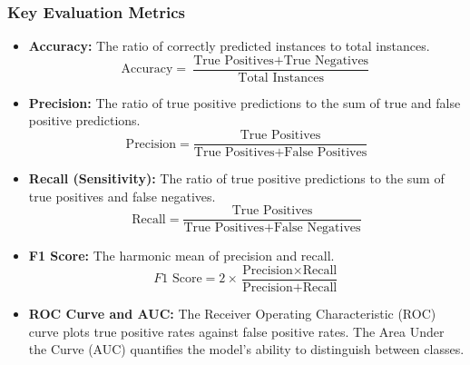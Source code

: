 \documentclass[aspectratio=169]{beamer}
\begin{document}
\begin{frame}[fragile]
    \frametitle{Key Evaluation Metrics}
    \begin{itemize}
        \item \textbf{Accuracy:} The ratio of correctly predicted instances to total instances.
        \begin{equation}
            \text{Accuracy} = \frac{\text{True Positives} + \text{True Negatives}}{\text{Total Instances}}
        \end{equation}
        
        \item \textbf{Precision:} The ratio of true positive predictions to the sum of true and false positive predictions.
        \begin{equation}
            \text{Precision} = \frac{\text{True Positives}}{\text{True Positives} + \text{False Positives}}
        \end{equation}
        
        \item \textbf{Recall (Sensitivity):} The ratio of true positive predictions to the sum of true positives and false negatives.
        \begin{equation}
            \text{Recall} = \frac{\text{True Positives}}{\text{True Positives} + \text{False Negatives}}
        \end{equation}
        
        \item \textbf{F1 Score:} The harmonic mean of precision and recall.
        \begin{equation}
            F1 \text{ Score} = 2 \times \frac{\text{Precision} \times \text{Recall}}{\text{Precision} + \text{Recall}}
        \end{equation}
        
        \item \textbf{ROC Curve and AUC:} The Receiver Operating Characteristic (ROC) curve plots true positive rates against false positive rates. The Area Under the Curve (AUC) quantifies the model's ability to distinguish between classes.
    \end{itemize}
\end{frame}
\end{document}
